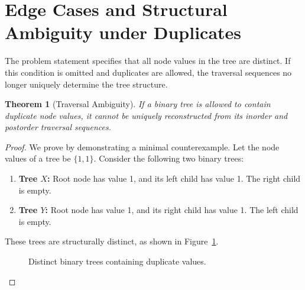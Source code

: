 \documentclass[10pt,journal,compsoc,onecolumn]{IEEEtran}
\newtheorem{theorem}{Theorem}
\begin{document}
\section{Edge Cases and Structural Ambiguity under Duplicates}
\label{sec:ambiguity}

The problem statement specifies that all node values in the tree are distinct. If this condition is omitted and duplicates are allowed, the traversal sequences no longer uniquely determine the tree structure.

\begin{theorem}[Traversal Ambiguity]
If a binary tree is allowed to contain duplicate node values, it cannot be uniquely reconstructed from its inorder and postorder traversal sequences.
\end{theorem}

\begin{proof}
We prove by demonstrating a minimal counterexample. Let the node values of a tree be $\{1, 1\}$. 
Consider the following two binary trees:
\begin{enumerate}
    \item \textbf{Tree $X$:} Root node has value 1, and its left child has value 1. The right child is empty.
    \item \textbf{Tree $Y$:} Root node has value 1, and its right child has value 1. The left child is empty.
\end{enumerate}

These trees are structurally distinct, as shown in Figure~\ref{fig:ambiguity}.

\begin{figure}[htbp]
\centering
\begin{minipage}{0.45\textwidth}
\centering
{}
\caption*{Tree $X$ (Left-skewed)}
\end{minipage}
\hfill
\begin{minipage}{0.45\textwidth}
\centering
{}
\caption*{Tree $Y$ (Right-skewed)}
\end{minipage}
\caption{Distinct binary trees containing duplicate values.}
\label{fig:ambiguity}
\end{figure}


\end{proof}
\end{document}

